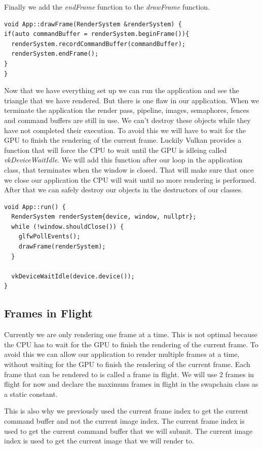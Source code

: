 \documentclass[12pt]{report} \usepackage{preamble}
\begin{document}
Finally we add the \textit{endFrame} function to the \textit{drawFrame} function.

\begin{lstlisting}[Language=C++]
void App::drawFrame(RenderSystem &renderSystem) {
if(auto commandBuffer = renderSystem.beginFrame()){
  renderSystem.recordCommandBuffer(commandBuffer); 
  renderSystem.endFrame();
}
}
\end{lstlisting}

Now that we have everything set up we can run the application and see the triangle that we have rendered.
But there is one flaw in our application. When we terminate the application the render pass, pipeline, images, semaphores, fences and command buffers
are still in use. We can't destroy these objects while they have not completed their execution. To avoid this we will have to wait for the
GPU to finish the rendering of the current frame. Luckily Vulkan provides a function that will force the \ac{CPU} to wait until the \ac{GPU}
is idleing called \textit{vkDeviceWaitIdle}. We will add this function after our loop in the application class, that terminates when the window
is closed. That will make sure that once we close our application the \ac{CPU} will wait until no more rendering is performed. After that we can
safely destroy our objects in the destructors of our classes.

\begin{lstlisting}[Language=C++]
void App::run() {
  RenderSystem renderSystem{device, window, nullptr};
  while (!window.shouldClose()) {
    glfwPollEvents();
    drawFrame(renderSystem);
  }

  vkDeviceWaitIdle(device.device());
}
\end{lstlisting}

\subsection{Frames in Flight}

Currently we are only rendering one frame at a time. This is not optimal because the CPU has to wait for the GPU to finish the rendering
of the current frame. To avoid this we can allow our application to render multiple frames at a time, without waiting for the GPU to finish
the rendering of the current frame. Each frame that can be rendered to is called a frame in flight. We will use 2 frames in flight for now
and declare the maximum frames in flight in the swapchain class as a static constant.

This is also why we previously used the current frame index to get the current command buffer and not the current image index. The current
frame index is used to get the current command buffer that we will submit. The current image index is used to get the current image that
we will render to.
\end{document}
